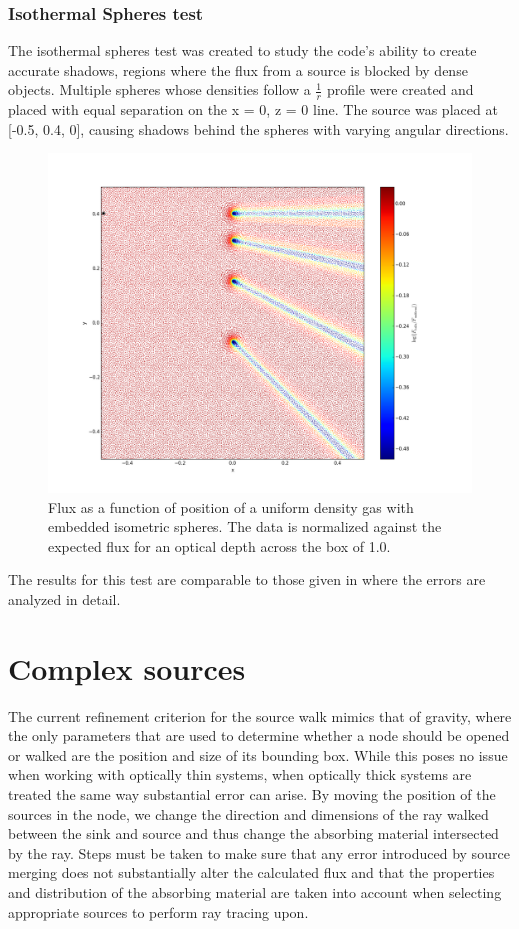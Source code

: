 \subsection{Isothermal Spheres test}

The isothermal spheres test was created to study the code's ability to create accurate shadows, regions where the flux from a source is blocked by dense objects. Multiple spheres whose densities follow a $\frac{1}{r}$ profile were created and placed with equal separation on the x = 0, z = 0 line. The source was placed at [-0.5, 0.4, 0], causing shadows behind the spheres with varying angular directions. 
\begin{figure} [H]
    \centering
    \includegraphics[width=\textwidth]{plots/CH4/balls_cha.png}
    \caption{Flux as a function of position of a uniform density gas with embedded isometric spheres. The data is normalized against the expected flux for an optical depth across the box of 1.0.}
    \label{fig:isoSpheres}
\end{figure}

The results for this test are comparable to those given in \citet{grond} where the errors are analyzed in detail.

\chapter{Complex sources}
\label{sec:complexsources}
The current refinement criterion for the source walk mimics that of gravity, where the only parameters that are used to determine whether a node should be opened or walked are the position and size of its bounding box. While this poses no issue when working with optically thin systems, when optically thick systems are treated the same way substantial error can arise. By moving the position of the sources in the node, we change the direction and dimensions of the ray walked between the sink and source and thus change the absorbing material intersected by the ray. Steps must be taken to make sure that any error introduced by source merging does not substantially alter the calculated flux and that the properties and distribution of the absorbing material are taken into account when selecting appropriate sources to perform ray tracing upon.

